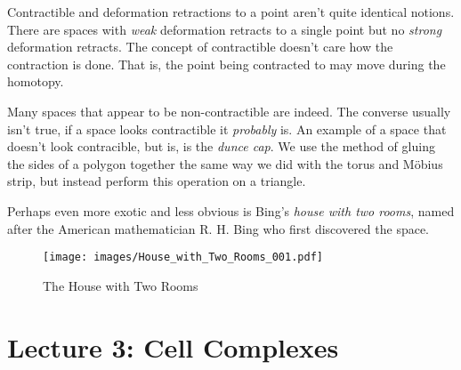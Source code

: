 \documentclass[oneside]{book}                                                  %
\begin{document}
                Contractible and deformation retractions to a point aren't quite
                identical notions. There are spaces with \textit{weak}
                deformation retracts to a single point but no \textit{strong}
                deformation retracts. The concept of contractible doesn't care
                how the contraction is done. That is, the point being contracted
                to may move during the homotopy.
                \par\hfill\par
                Many spaces that appear to be non-contractible are indeed. The
                converse usually isn't true, if a space looks contractible it
                \textit{probably} is. An example of a space that doesn't look
                contracible, but is, is the \textit{dunce cap}. We use the
                method of gluing the sides of a polygon together the same way we
                did with the torus and M\"{o}bius strip, but instead perform
                this operation on a triangle.
                \par\hfill\par
                Perhaps even more exotic and less obvious is Bing's
                \textit{house with two rooms}, named after the American
                mathematician R. H. Bing who first discovered the space.
                \begin{figure}[H]
                    \centering
                    \captionsetup{type=figure}
                    \texttt{[image: images/House\_with\_Two\_Rooms\_001.pdf]}
                    \caption{The House with Two Rooms}
                    \label{fig:House_with_Two_Rooms_001}
                \end{figure}
        \section{Lecture 3: Cell Complexes}
\end{document}

